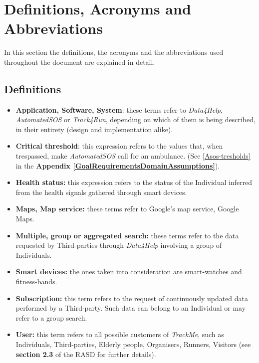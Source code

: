 \section{Definitions, Acronyms and Abbreviations}
    In this section the definitions, the acronyms and the abbreviations used throughout the document are explained in detail.
        
        \subsection{Definitions}
        \begin{itemize}
            \item \textbf{Application, Software, System}: these terms refer to \emph{Data4Help}, \emph{AutomatedSOS} or \emph{Track4Run}, depending on which of them is being described, in their entirety (design and implementation alike).
            
            \item \textbf{Critical threshold}: this expression refers to the values that, when trespassed, make \emph{AutomatedSOS} call for an ambulance. (See \ref{Asos-tresholds} in the \textbf{Appendix \ref{GoalRequirementsDomainAssumptions}}). 
            
            \item \textbf{Health status:} this expression refers to the status of the Individual inferred from the health signals gathered through smart devices.
            
            \item \textbf{Maps, Map service:} these terms refer to Google's map service, Google Maps.
            
            \item \textbf{Multiple, group or aggregated search:} these terms refer to the data requested by Third-parties through \emph{Data4Help} involving a group of Individuals.
            
            \item \textbf{Smart devices:} the ones taken into consideration are smart-watches and fitness-bands.
            
            \item \textbf{Subscription:} this term refers to the request of continuously updated data performed by a Third-party. Such data can belong to an Individual or may refer to a group search.
                        
            \item \textbf{User:} this term refers to all possible customers of \emph{TrackMe}, such as Individuals, Third-parties, Elderly people, Organisers, Runners, Visitors (see \textbf{section 2.3} of the RASD for further details).
            

\end{itemize}

